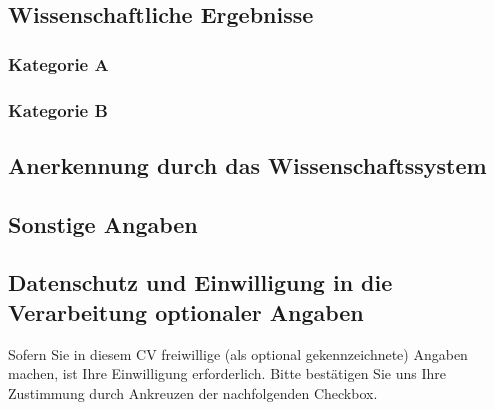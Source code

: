 \documentclass{scrartcl}
\begin{document}
\subsection*{Wissenschaftliche Ergebnisse}
\nocite{*}

\subsubsection*{Kategorie A}
\printbibliography[category=reviewed, heading=none]

\subsubsection*{Kategorie B}
\printbibliography[category=nonreviewed, heading=none, resetnumbers=true]

\subsection*{Anerkennung durch das Wissenschaftssystem}

\subsection*{Sonstige Angaben}

\subsection*{Datenschutz und Einwilligung in die Verarbeitung optionaler Angaben}

Sofern Sie in diesem CV freiwillige (als optional gekennzeichnete) Angaben machen, ist Ihre Einwilligung erforderlich.
Bitte bestätigen Sie uns Ihre Zustimmung durch Ankreuzen der nachfolgenden Checkbox.
\end{document}
